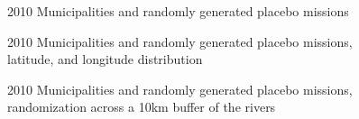 \begin{landscape}
  \begin{figure}[t]
    \begin{center}
    \end{center}
    \caption{2010 Municipalities and randomly generated placebo missions}
    \label{fig:PlaceboMapv2}
  \end{figure}
\end{landscape}
 
\begin{landscape}
  \begin{figure}[t]
    \begin{center}
    \end{center}
    \caption{2010 Municipalities and randomly generated placebo missions, latitude, and longitude distribution}
    \label{fig:PlaceboMap}
  \end{figure}
\end{landscape}

\begin{landscape}
\begin{figure}[t]
	\begin{center}
	\end{center}
	\caption{2010 Municipalities and randomly generated placebo missions, randomization across a 10km buffer of the rivers}
	\label{fig:PlaceboMapRiver}
\end{figure}
\end{landscape}
